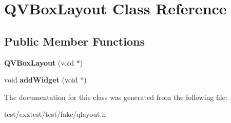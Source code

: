 \hypertarget{classQVBoxLayout}{\section{Q\-V\-Box\-Layout Class Reference}
\label{classQVBoxLayout}
}
\subsection*{Public Member Functions}
\begin{DoxyCompactItemize}
\item 
\hypertarget{classQVBoxLayout_a5b7e14373afbc4cb2cf37e44c30de8ab}{{\bfseries Q\-V\-Box\-Layout} (void $\ast$)}\label{classQVBoxLayout_a5b7e14373afbc4cb2cf37e44c30de8ab}

\item 
\hypertarget{classQVBoxLayout_a575aab2f6c140a094e3f69eb21d11b89}{void {\bfseries add\-Widget} (void $\ast$)}\label{classQVBoxLayout_a575aab2f6c140a094e3f69eb21d11b89}

\end{DoxyCompactItemize}


The documentation for this class was generated from the following file\-:\begin{DoxyCompactItemize}
\item 
test/cxxtest/test/fake/qlayout.\-h\end{DoxyCompactItemize}
